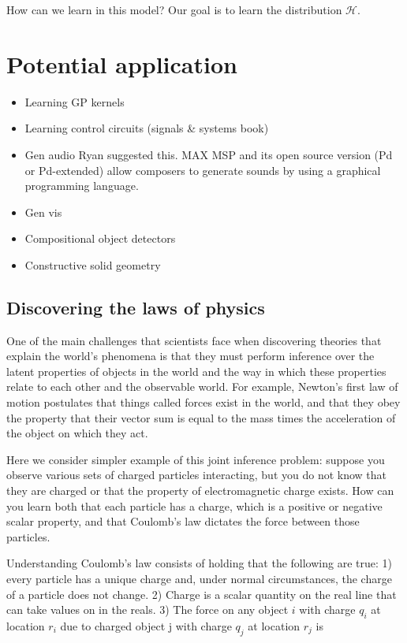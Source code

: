 \documentclass{article}
\begin{document}
How can we learn in this model? Our goal is to learn the distribution
$\mathcal{H}$.  

\section{Potential application}
\begin{itemize}
  \item Learning GP kernels
  \item Learning control circuits (signals \& systems book)
  \item Gen audio
    Ryan suggested this. MAX MSP and its open source version (Pd or
    Pd-extended) allow composers to generate sounds by using a graphical
    programming language. 
  \item Gen vis
  \item Compositional object detectors
  \item Constructive solid geometry
\end{itemize}

\subsection{Discovering the laws of physics}
One of the main challenges that scientists face when discovering theories that
explain the world's phenomena is that they must perform inference over the
latent properties of objects in the world and the way in which these properties
relate to each other and the observable world. For example, Newton's first law
of motion postulates that things called forces exist in the world, and that
they obey the property that their vector sum is equal to the mass times the
acceleration of the object on which they act. 

Here we consider simpler example of this joint inference problem: suppose you
observe various sets of charged particles interacting, but you do not know that
they are charged or that the property of electromagnetic charge exists. How can
you learn both that each particle has a charge, which is a positive or negative
scalar property, and that Coulomb's law dictates the force between those
particles. 

Understanding Coulomb's law consists of holding that the following are true: 1)
every particle has a unique charge and, under normal circumstances, the charge
of a particle does not change. 2) Charge is a scalar quantity on the real line
that can take values on in the reals. 3) The force on any object $i$ with charge $q_i$ at location $r_i$ due to charged object j with charge $q_j$ at location $r_j$ is 
\end{document}
